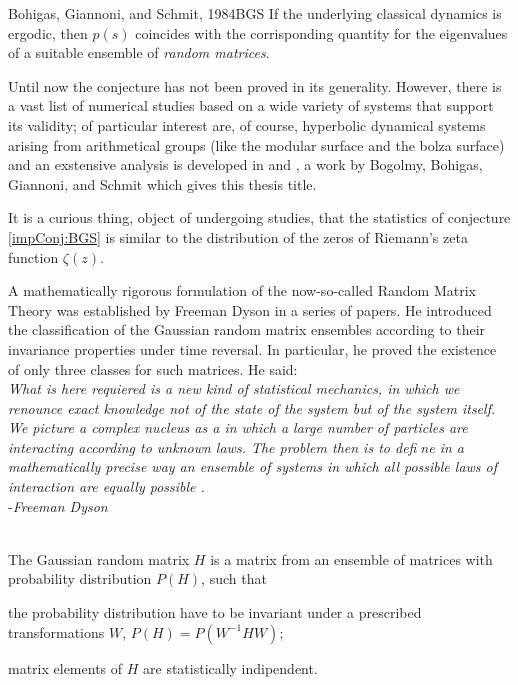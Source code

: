 \begin{impConj}{Bohigas, Giannoni, and Schmit, 1984}{BGS}
If the underlying classical dynamics is ergodic, then $p(s)$ coincides with the corrisponding quantity for the eigenvalues of a suitable ensemble of \emph{random matrices}.
\end{impConj}


Until now the conjecture has not been proved in its generality. However, there is a vast list of
numerical studies based on a wide variety of systems that support its validity; of particular interest are, of course, hyperbolic dynamical systems arising from arithmetical groups (like the modular surface and the bolza surface) and an exstensive analysis is developed in \cite{bogomolnyaltri:article} and \cite{bogomolny:article}, a work by Bogolmy, Bohigas, Giannoni, and Schmit which gives this thesis title. 
\begin{remark}
\label{remark:zeta_spectra}
It is a curious thing, object of undergoing studies, that the statistics of conjecture \ref{impConj:BGS} is similar to the distribution of the zeros of Riemann's zeta function $\zeta(z)$. 
\end{remark}

A mathematically rigorous formulation of the now-so-called Random Matrix Theory \RMT was established by Freeman Dyson in a series of papers. He introduced the classification of the Gaussian random matrix ensembles according to their invariance properties under time reversal. In particular, he proved the existence of only three classes for such matrices. He said:\\
\textit{
What is here requiered is a new kind of statistical mechanics, in which we renounce exact knowledge not of the state of the
system but of the system itself. We picture a complex nucleus as a  in which a large number of particles are interacting according to unknown laws. The problem then is to define in a mathematically precise way an ensemble of systems in which all possible laws of interaction are equally possible
.}\\
\hspace*{10cm}-\emph{Freeman Dyson}\\
\noindent\\

\begin{defin}
\label{def:gauss_rand_matrix}
The Gaussian random matrix $H$ is a matrix from an ensemble of matrices with probability distribution $P(H)$, such that
\begin{compactitem}
\item the probability distribution have to be invariant under a prescribed transformations $W$, $P(H)=P(W^{-1}HW)$;
\item matrix elements of $H$ are statistically indipendent.
\end{compactitem}
\end{defin}

